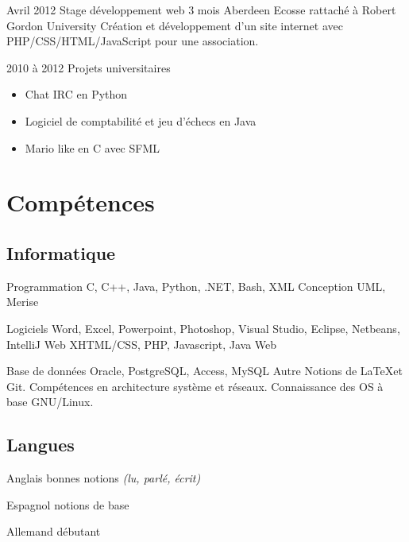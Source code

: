 \documentclass[10pt,a4paper]{moderncv}
\begin{document}
\cventry
	{Avril 2012}
	{Stage développement web}
	{3 mois}
	{Aberdeen Ecosse}
	{rattaché à Robert Gordon University}
	{Création et développement d'un site internet avec PHP/CSS/HTML/JavaScript pour une association.}

\cventry
	{2010 à 2012}
	{Projets universitaires}
	{}
	{}
	{}
	{
		\begin{itemize}
			\item Chat IRC en Python
			\item Logiciel de comptabilité et jeu d'échecs en Java
			\item Mario like en C avec SFML
		\end{itemize}
	}


\section{Compétences}

\subsection{Informatique}

\cvcomputer
	{Programmation}
	{C, C++, Java, Python, .NET, Bash, XML}
	{Conception}
	{UML, Merise}

\cvcomputer
	{Logiciels}
	{Word, Excel, Powerpoint, Photoshop, Visual Studio, Eclipse, Netbeans, IntelliJ}
	{Web}
	{XHTML/CSS, PHP, Javascript, Java Web}

\cvcomputer
	{Base de données}
	{Oracle, PostgreSQL, Access, MySQL}
	{Autre}
	{Notions de \LaTeX et Git. Compétences en architecture système et réseaux. Connaissance des OS à base GNU/Linux.}

\subsection{Langues}

\cvlanguage
	{Anglais}
	{bonnes notions \textnormal{\textit{(lu, parlé, écrit)}}}
	{}

\cvlanguage
	{Espagnol}
	{notions de base}
	{}

\cvlanguage
	{Allemand}
	{débutant}
	{}

\end{document}
